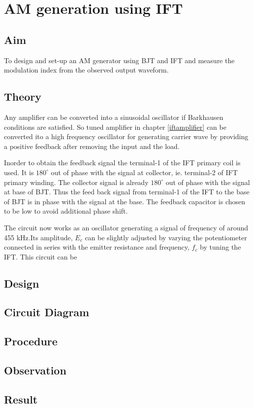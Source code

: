 \chapter[AM generation using IFT]{AM generation using IFT}

\section*{Aim}
To design and set-up  an AM generator using BJT and IFT and measure the modulation index from the observed output waveform.

\section*{Theory}
Any amplifier can be converted into a sinusoidal oscillator if Barkhausen conditions are satisfied. So tuned amplifier in chapter \ref{iftamplifier} can be converted ito a high frequency oscillator for generating carrier wave by providing a positive feedback after removing  the input and the load.

Inorder to obtain the feedback signal the terminal-1 of the IFT primary coil is used. It is $180^{\circ}$ out of phase with the signal at collector, ie. terminal-2 of IFT primary winding. The collector signal is already $180^{\circ}$ out of phase with the signal at base of BJT. Thus the feed back signal from terminal-1 of the IFT to the base of BJT is in phase with the signal at the base. The feedback capacitor is chosen to be low to avoid additional phase shift.  

The circuit now works as an oscillator generating a signal of frequency of around 455 kHz.Its amplitude, $E_c$ can be slightly adjusted by varying the potentiometer connected in series with the emitter resistance and frequency, $f_c$ by tuning the IFT. This circuit can be 

\section*{Design}

\section*{Circuit Diagram}

\section*{Procedure}
\section*{Observation}
\section*{Result}

